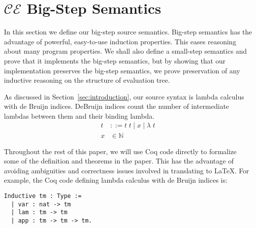 \section{$\mathcal{CE}$ Big-Step Semantics} \label{sec:cem_big}

In this section we define our big-step source semantics. Big-step semantics
has the advantage of powerful, easy-to-use induction properties. This eases
reasoning about many program properties. We shall also define a small-step
semantics and prove that it implements the big-step semantics, but by showing
that our implementation preserves the big-step semantics, we prove preservation
of any inductive reasoning on the structure of evaluation tree.  

As discussed in Section~\ref{sec:introduction}, our source syntax is lambda calculus with
de Bruijn indices. DeBruijn indices count the number of intermediate lambdas
between them and their binding lambda.  
\begin{align*}
 t &::= t \; t \; | \; x \; | \;  \lambda \; t \\
 x &\in \mathbb{N}
\end{align*}

Throughout the rest of this paper, we will use Coq code directly to formalize
some of the definition and theorems in the paper. This has the advantage of
avoiding ambiguities and correctness issues involved in translating to \LaTeX.
For example, the Coq code defining lambda calculus with de Bruijn indices is: 

\begin{lstlisting}
Inductive tm : Type := 
  | var : nat -> tm 
  | lam : tm -> tm
  | app : tm -> tm -> tm.
\end{lstlisting}

